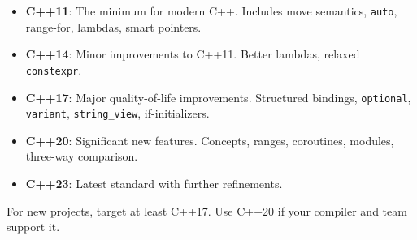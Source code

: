 \begin{itemize}
	\item \textbf{C++11}: The minimum for modern C++. Includes move semantics, \texttt{auto}, range-for, lambdas, smart pointers.
	\item \textbf{C++14}: Minor improvements to C++11. Better lambdas, relaxed \texttt{constexpr}.
	\item \textbf{C++17}: Major quality-of-life improvements. Structured bindings,
		\texttt{optional}, \texttt{variant}, \texttt{string\_view}, if-initializers.
	\item \textbf{C++20}: Significant new features. Concepts, ranges, coroutines, modules, three-way comparison.
	\item \textbf{C++23}: Latest standard with further refinements.
\end{itemize}

For new projects, target at least C++17. Use C++20 if your compiler and team support it.